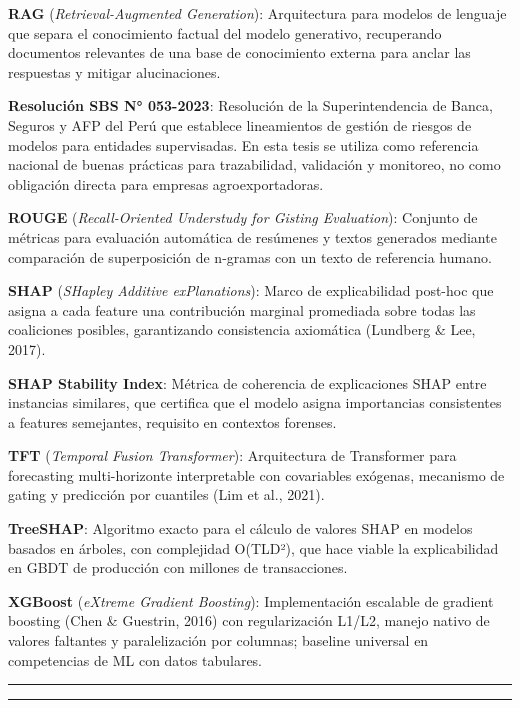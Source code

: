 \textbf{RAG} (\emph{Retrieval-Augmented Generation}): Arquitectura para
modelos de lenguaje que separa el conocimiento factual del modelo
generativo, recuperando documentos relevantes de una base de
conocimiento externa para anclar las respuestas y mitigar alucinaciones.

\textbf{Resolución SBS N° 053-2023}: Resolución de la Superintendencia
de Banca, Seguros y AFP del Perú que establece lineamientos de gestión
de riesgos de modelos para entidades supervisadas. En esta tesis se
utiliza como referencia nacional de buenas prácticas para trazabilidad,
validación y monitoreo, no como obligación directa para empresas
agroexportadoras.

\textbf{ROUGE} (\emph{Recall-Oriented Understudy for Gisting
Evaluation}): Conjunto de métricas para evaluación automática de
resúmenes y textos generados mediante comparación de superposición de
n-gramas con un texto de referencia humano.

\textbf{SHAP} (\emph{SHapley Additive exPlanations}): Marco de
explicabilidad post-hoc que asigna a cada feature una contribución
marginal promediada sobre todas las coaliciones posibles, garantizando
consistencia axiomática (Lundberg \& Lee, 2017).

\textbf{SHAP Stability Index}: Métrica de coherencia de explicaciones
SHAP entre instancias similares, que certifica que el modelo asigna
importancias consistentes a features semejantes, requisito en contextos
forenses.

\textbf{TFT} (\emph{Temporal Fusion Transformer}): Arquitectura de
Transformer para forecasting multi-horizonte interpretable con
covariables exógenas, mecanismo de gating y predicción por cuantiles
(Lim et al., 2021).

\textbf{TreeSHAP}: Algoritmo exacto para el cálculo de valores SHAP en
modelos basados en árboles, con complejidad O(TLD²), que hace viable la
explicabilidad en GBDT de producción con millones de transacciones.

\textbf{XGBoost} (\emph{eXtreme Gradient Boosting}): Implementación
escalable de gradient boosting (Chen \& Guestrin, 2016) con
regularización L1/L2, manejo nativo de valores faltantes y
paralelización por columnas; baseline universal en competencias de ML
con datos tabulares.

\begin{center}\rule{0.5\linewidth}{0.5pt}\end{center}

\begin{center}\rule{0.5\linewidth}{0.5pt}\end{center}

